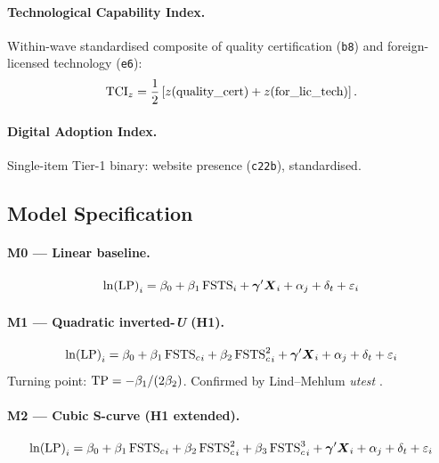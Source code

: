 \documentclass[12pt,a4paper]{article}
\begin{document}
\paragraph{Technological Capability Index.}
Within-wave standardised composite of quality certification (\texttt{b8}) and
foreign-licensed technology (\texttt{e6}):
\begin{equation}
  {\mathrm{TCI}_{z}} = \frac{1}{2}\left[z(\text{quality\_cert}) + z(\text{for\_lic\_tech})\right].
  \label{eq:tci}
\end{equation}

\paragraph{Digital Adoption Index.}
Single-item Tier-1 binary: website presence (\texttt{c22b}), standardised.

\subsection{Model Specification}

\paragraph{M0 --- Linear baseline.}
\begin{equation}
  {\ln(\mathrm{LP})}_{i} = \beta_{0} + \beta_{1}\,{\mathrm{FSTS}}_{i}
    + \boldsymbol{\gamma}'\boldsymbol{X}_{i} + {\alpha_{j}} + {\delta_{t}} + \varepsilon_{i}
  \label{eq:M0}
\end{equation}

\paragraph{M1 --- Quadratic inverted-\textit{U} (H1).}
\begin{equation}
  {\ln(\mathrm{LP})}_{i} = \beta_{0} + \beta_{1}\,{\mathrm{FSTS}_{c}}_{i} + \beta_{2}\,{\mathrm{FSTS}_{c}^{2}}_{i}
    + \boldsymbol{\gamma}'\boldsymbol{X}_{i} + {\alpha_{j}} + {\delta_{t}} + \varepsilon_{i}
  \label{eq:M1}
\end{equation}
Turning point: \(\mathrm{TP} = -\beta_{1}/(2\beta_{2})\).  Confirmed by
Lind--Mehlum \textit{utest} \parencite{LindMehlum2010}.

\paragraph{M2 --- Cubic S-curve (H1 extended).}
\begin{equation}
  {\ln(\mathrm{LP})}_{i} = \beta_{0} + \beta_{1}\,{\mathrm{FSTS}_{c}}_{i} + \beta_{2}\,{\mathrm{FSTS}_{c}^{2}}_{i}
    + \beta_{3}\,{\mathrm{FSTS}_{c}^{3}}_{i}
    + \boldsymbol{\gamma}'\boldsymbol{X}_{i} + {\alpha_{j}} + {\delta_{t}} + \varepsilon_{i}
  \label{eq:M2}
\end{equation}
\end{document}

